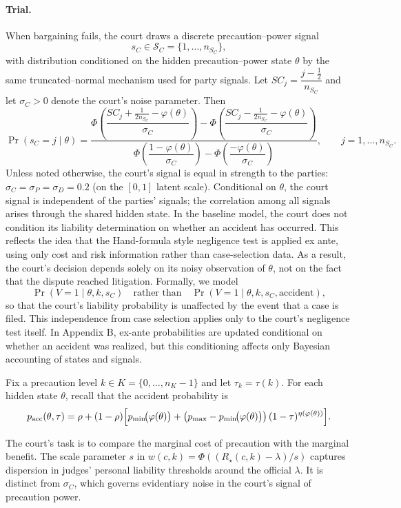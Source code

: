 \documentclass{article}
\begin{document}
\paragraph{Trial.}
When bargaining fails, the court draws a discrete precaution–power signal
\[
s_C \in \mathcal{S}_C=\{1,\dots,n_{S_C}\},
\]
with distribution conditioned on the hidden precaution–power state $\theta$ by the same truncated–normal mechanism used for party signals. Let $SC_j=\dfrac{j-\tfrac12}{n_{S_C}}$ and let $\sigma_{C}>0$ denote the court’s noise parameter. Then
\[
\Pr(s_C=j\mid \theta)
=
\frac{
\Phi\!\left(\dfrac{SC_j+\tfrac{1}{2n_{S_C}}-\varphi(\theta)}{\sigma_{C}}\right)
-
\Phi\!\left(\dfrac{SC_j-\tfrac{1}{2n_{S_C}}-\varphi(\theta)}{\sigma_{C}}\right)
}{
\Phi\!\left(\dfrac{1-\varphi(\theta)}{\sigma_{C}}\right)
-
\Phi\!\left(\dfrac{-\varphi(\theta)}{\sigma_{C}}\right)
},
\qquad j=1,\dots,n_{S_C}.
\]
Unless noted otherwise, the court's signal is equal in strength to the parties: $\sigma_C = \sigma_P = \sigma_D= 0.2$ (on the $[0,1]$ latent scale). Conditional on $\theta$, the court signal is independent of the parties’ signals; the correlation among all signals arises through the shared hidden state. In the baseline model, the court does not condition its liability determination on whether an accident has occurred. This reflects the idea that the Hand-formula style negligence test is applied ex ante, using only cost and risk information rather than case-selection data. As a result, the court’s decision depends solely on its noisy observation of $\theta$, not on the fact that the dispute reached litigation. Formally, we model
\[
\Pr(V=1 \mid \theta,k,s_C) \quad \text{rather than} \quad \Pr(V=1 \mid \theta,k,s_C,\text{accident}),
\]
so that the court’s liability probability is unaffected by the event that a case is filed. This independence from case selection applies only to the court’s negligence test itself. In Appendix B, ex-ante probabilities are updated conditional on whether an accident was realized, but this conditioning affects only Bayesian accounting of states and signals.

Fix a precaution level $k\in K=\{0,\dots,n_K-1\}$ and let $\tau_k=\tau(k)$. For each hidden state $\theta$, recall that the accident probability is
\[
p_{\mathrm{acc}}(\theta,\tau)
=\rho+(1-\rho)\Bigl[p_{\min}\!\bigl(\varphi(\theta)\bigr)
+\bigl(p_{\max}-p_{\min}\!\bigl(\varphi(\theta)\bigr)\bigr)\,(1-\tau)^{\eta(\varphi(\theta))}\Bigr].
\]

The court's task is to compare the marginal cost of precaution with the marginal benefit. The scale parameter $s$ in $w(c,k)=\Phi((R_\star(c,k)-\lambda)/s)$ captures dispersion in judges’ personal liability thresholds around the official $\lambda$. It is distinct from $\sigma_C$, which governs evidentiary noise in the court’s signal of precaution power.
\end{document}
